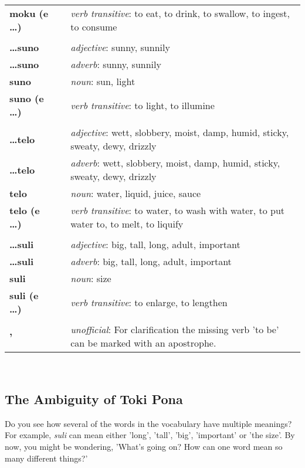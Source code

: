 \begin{supertabular}{p{2,5cm}|ll}
\textbf{moku (e \dots)} && \textit{verb transitive}: to eat, to drink, to swallow, to ingest, to consume \\ %
 && \\ %
\textbf{\dots suno} && \textit{adjective}: sunny, sunnily \\ %
\textbf{\dots suno} && \textit{adverb}: sunny, sunnily \\ %
\textbf{suno} && \textit{noun}: sun, light \\ %
\textbf{suno (e \dots)} && \textit{verb transitive}: to light, to illumine \\ %
 && \\ %
\textbf{\dots telo} && \textit{adjective}: wett, slobbery, moist, damp, humid, sticky, sweaty, dewy, drizzly \\ %
\textbf{\dots telo} && \textit{adverb}: wett, slobbery, moist, damp, humid, sticky, sweaty, dewy, drizzly \\ %
\textbf{telo} && \textit{noun}: water, liquid, juice, sauce \\ %
\textbf{telo (e \dots)} && \textit{verb transitive}: to water, to wash with water, to put water to, to melt, to liquify \\ %
 && \\ %
\textbf{\dots suli} && \textit{adjective}: big, tall, long, adult, important \\ %
\textbf{\dots suli} && \textit{adverb}: big, tall, long, adult, important \\ %
\textbf{suli} && \textit{noun}: size \\ %
\textbf{suli (e \dots)} && \textit{verb transitive}: to enlarge, to lengthen \\ %
 && \\ %
\textbf{'} && \textit{unofficial}: For clarification the missing verb 'to be' can be marked with an apostrophe.  \\ %
\end{supertabular} \\
%
\newpage
\subsection*{The Ambiguity of Toki Pona}
%
Do you see how several of the words in the vocabulary have multiple meanings? 
For example, \textit{suli} can mean either 'long', 'tall', 'big', 'important' or 'the size'. 
By now, you might be wondering, 'What's going on? How can one word mean so many different things?' 

